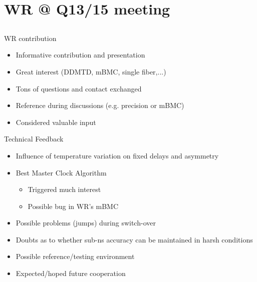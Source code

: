 \documentclass[compress,red]{beamer}
\begin{document}
\section{WR @ Q13/15 meeting}
\subsection{}
\begin{frame}{WR contribution}

  \begin{itemize}
    \item Informative contribution and presentation
    \item Great interest (DDMTD, mBMC, single fiber,...)
    \item Tons of questions and contact exchanged
    \item Reference during discussions (e.g. precision or mBMC)
    \item Considered valuable input
  \end{itemize}

\end{frame}
\begin{frame}{Technical Feedback}

  \begin{itemize}
    \item Influence of temperature variation on fixed delays and asymmetry
    \item Best Master Clock Algorithm
	\begin{itemize}
	  \item Triggered much interest
	  \item Possible bug in WR's mBMC
	\end{itemize}    
    \item Possible problems (jumps) during switch-over
    \item Doubts as to whether sub-ns accuracy can be maintained in harsh conditions
    \item Possible reference/testing environment
    \item Expected/hoped future cooperation
  \end{itemize}


\end{frame}
\end{document}

